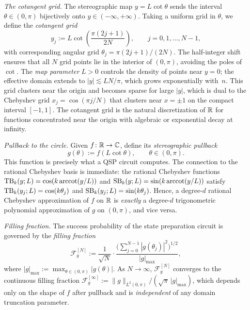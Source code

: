 \textit{The cotangent grid.}
The stereographic map $y = L\cot\theta$ sends the interval
$\theta \in (0,\pi)$ bijectively onto
$y \in (-\infty,+\infty)$.  Taking a uniform grid in $\theta$,
we define the \emph{cotangent grid}
\begin{equation}
	y_j := L\cot\!\left(\frac{\pi(2j+1)}{2N}\right),
	\qquad j = 0, 1, \ldots, N-1,
	\label{eq:cotangent-grid}
\end{equation}
with corresponding angular grid
$\theta_j = \pi(2j+1)/(2N)$.  The half-integer shift ensures
that all $N$ grid points lie in the interior of $(0,\pi)$,
avoiding the poles of $\cot$.  The \emph{map parameter} $L > 0$
controls the density of points near $y = 0$; the effective
domain extends to $|y| \lesssim LN/\pi$, which grows
exponentially with~$n$.  This grid clusters near the origin and
becomes sparse for large $|y|$, which is dual to the Chebyshev
grid $x_j = \cos(\pi j/N)$ that clusters near $x = \pm 1$ on
the compact interval $[-1,1]$.  The cotangent grid is the
natural discretization of $\mathbb{R}$ for functions concentrated near
the origin with algebraic or exponential decay at infinity.

\textit{Pullback to the circle.}
Given $f\colon \mathbb{R} \to \mathbb{C}$, define its \emph{stereographic
pullback}
\begin{equation}
	g(\theta) := f(L\cot\theta), \qquad \theta \in (0,\pi).
	\label{eq:pullback}
\end{equation}
This function is precisely what a QSP circuit computes.
The connection to the rational Chebyshev basis is immediate: the
rational Chebyshev functions
$\mathrm{TB}_k(y;L) = \cos(k\,\mathrm{arccot}(y/L))$ and
$\mathrm{SB}_k(y;L) = \sin(k\,\mathrm{arccot}(y/L))$ satisfy
$\mathrm{TB}_k(y_j;L) = \cos(k\theta_j)$ and
$\mathrm{SB}_k(y_j;L) = \sin(k\theta_j)$.  Hence, a degree-$d$
rational Chebyshev approximation of $f$ on $\mathbb{R}$ is
\emph{exactly} a degree-$d$ trigonometric polynomial
approximation of $g$ on $(0,\pi)$, and vice versa.

\textit{Filling fraction.}
The success probability of the state preparation circuit is
governed by the \emph{filling fraction}
\begin{equation}
	\mathcal{F}_g^{[N]} := \frac{1}{\sqrt{N}} \cdot
	\frac{\bigl(\sum_{j=0}^{N-1}|g(\theta_j)|^2\bigr)^{1/2}}
	{|g|_{\max}},
	\label{eq:filling-fraction}
\end{equation}
where $|g|_{\max} := \max_{\theta \in (0,\pi)} |g(\theta)|$.
As $N \to \infty$, $\mathcal{F}_g^{[N]}$ converges to the
continuous filling fraction
$\mathcal{F}_g^{[\infty]} := \|g\|_{L^2(0,\pi)} /
(\sqrt{\pi}\,|g|_{\max})$,
which depends only on the shape of $f$ after pullback and is
\emph{independent} of any domain truncation parameter.

